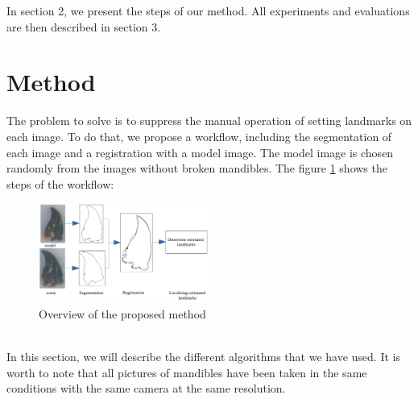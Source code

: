 \documentclass[twoside,twocolumn,10pt]{article}
\begin{document}
In section 2, we present the steps of our method. All
experiments and evaluations are then described in section 3. 

\section{Method}
The problem to solve is to suppress the manual operation of setting
landmarks on each image. To do that, we propose a workflow, including the segmentation of each image and a registration
with a model image. The model image is chosen randomly from the images without broken mandibles. The figure \ref{fig:method} shows the steps of the workflow: \\
\begin{figure}[htb]
    \centering
    \includegraphics[width=0.5\textwidth]{./images/method}
    \caption{Overview of the proposed method}
    \label{fig:method}
\end{figure}~\\
In this section, we will describe the different algorithms that we have
used. It is worth to note that all pictures of mandibles have
been taken in the same conditions with the same camera at the same resolution.
\end{document}
